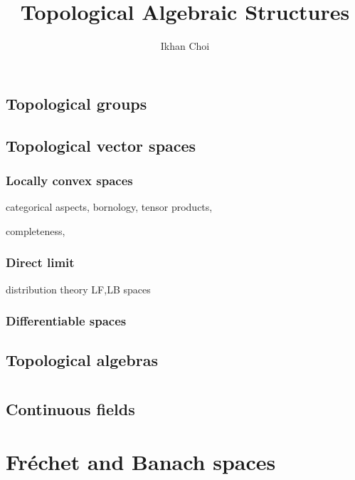 \documentclass{../../large}
\begin{document}
\title{Topological Algebraic Structures}
\author{Ikhan Choi}
\maketitle
\tableofcontents

\part{}



\chapter{Topological groups}

\chapter{Topological vector spaces}
\section{Locally convex spaces}
categorical aspects,
bornology,
tensor products,






completeness,
\section{Direct limit}
distribution theory
LF,LB spaces
\section{Differentiable spaces}


\chapter{Topological algebras}

\part{}
\chapter{Continuous fields}


\part{Fr\'echet and Banach spaces}
\end{document}
